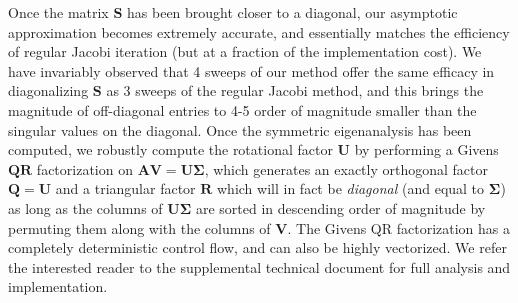 Once the matrix $\mathbf{S}$ has been brought closer to a diagonal, our asymptotic approximation becomes extremely accurate, and essentially matches the efficiency of regular Jacobi
iteration (but at a fraction of the implementation cost). We have invariably observed that 4 sweeps of our method offer the same efficacy in diagonalizing $\mathbf{S}$ as 3 sweeps of the
regular Jacobi method, and this brings the magnitude of off-diagonal entries to 4-5 order of magnitude smaller than the singular values on the diagonal. Once the symmetric eigenanalysis
has been computed, we robustly compute the rotational factor $\mathbf{U}$ by performing a Givens $\mathbf{QR}$ factorization on $\mathbf{AV}=\mathbf{U\Sigma}$, which generates an exactly
orthogonal factor $\mathbf{Q}=\mathbf{U}$ and a triangular factor $\mathbf{R}$ which will in fact be \emph{diagonal} (and equal to $\mathbf{\Sigma}$) as long as the columns of
$\mathbf{U\Sigma}$ are sorted in descending order of magnitude by permuting them along with the columns of $\mathbf{V}$. The Givens QR factorization has a completely deterministic
control flow, and can also be highly vectorized. We refer the interested reader
to the supplemental technical document for full analysis and implementation.

